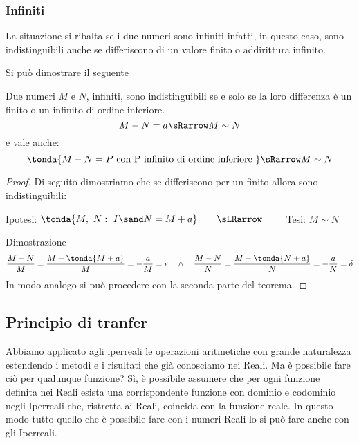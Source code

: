 \subsubsection{Infiniti}
\label{subsubsec:insnum_infiniti}

La situazione si ribalta se i due numeri sono infiniti infatti, in 
questo caso, sono indistinguibili anche se differiscono di 
un valore finito o addirittura infinito. 

Si può dimostrare il seguente
\begin{teorema}
Due numeri \(M\) e \(N\), infiniti, 
sono indistinguibili se e solo se la loro differenza è un finito o 
un infinito di ordine inferiore.
\[M-N = a \sRarrow M \sim N\] 
e vale anche:
\[\tonda{M-N = P \text{ con P infinito di ordine inferiore }} 
\sRarrow M \sim N\] 
\end{teorema}
\begin{proof}
Di seguito dimostriamo che se differiscono per un finito allora 
sono indistinguibili:
\begin{center}
Ipotesi: \(\tonda{M,~N:\ I \sand N = M+a}
\qquad \sLRarrow\qquad\) 
Tesi: \(M \sim N\)
\end{center}
Dimostrazione
\[\frac{M-N}{M}=
\frac{M-\tonda{M +a}}{M} = 
-\frac{a}{M}= \epsilon \quad \wedge \quad 
\frac{M-N}{N}=
\frac{M-\tonda{N +a}}{N} = 
-\frac{a}{N}= \delta
\]
In modo analogo si può procedere con la seconda parte del teorema.
\end{proof}

\subsection{Principio di tranfer}
\label{subsec:insnum_nonarchimedei}

Abbiamo applicato agli iperreali le operazioni aritmetiche con grande 
naturalezza estendendo i metodi e i risultati che già conosciamo nei Reali. 
Ma è possibile fare ciò per qualunque funzione? 
Sì, è possibile assumere che per ogni funzione definita nei Reali esista 
una corrispondente funzione con dominio e codominio negli Iperreali che, 
ristretta ai Reali, coincida con la funzione reale.
In questo modo tutto quello che è possibile fare con i numeri Reali lo si 
può fare anche con gli Iperreali.

